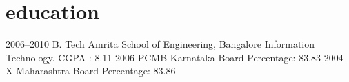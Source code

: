 \documentclass[]{kartikkumar-cv}
\begin{document}
\section{education}

\begin{entrylist}
  \entry
    {2006–2010}
    {B. Tech }
    {Amrita School of Engineering, Bangalore}
    {Information Technology. CGPA : 8.11}
  \entry
    {2006}
    {PCMB}
    {Karnataka Board}
    {Percentage: 83.83}
  \entry
    {2004}
    {X}
    {Maharashtra Board}
    {Percentage: 83.86}
\end{entrylist}
\end{document}
